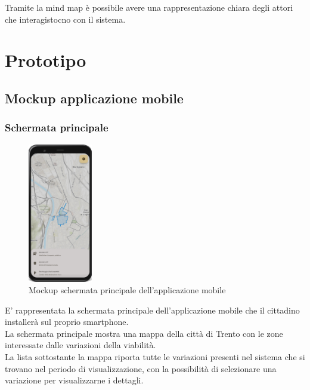 \documentclass{article}
\begin{document}
Tramite la mind map è possibile avere una rappresentazione chiara degli attori che interagistocno con il sistema.\\
\clearpage

\section{Prototipo}

\subsection{Mockup applicazione mobile}

\subsubsection{Schermata principale}
\begin{figure}[htbp]
    \label{fig:Schermata_principale_mobile}
    \centering
    \includegraphics[width=0.25\textwidth]{Images/Mockup1 - Mobile.png}
    \caption{Mockup schermata principale dell'applicazione mobile}
\end{figure}

E' rappresentata la schermata principale dell'applicazione mobile che il cittadino installerà sul proprio smartphone.\\
La schermata principale mostra una mappa della città di Trento con le zone interessate dalle variazioni della viabilità.\\
La lista sottostante la mappa riporta tutte le variazioni presenti nel sistema che si trovano nel periodo di visualizzazione, con la possibilità di selezionare una variazione per visualizzarne i dettagli.\\
\clearpage
\end{document}
